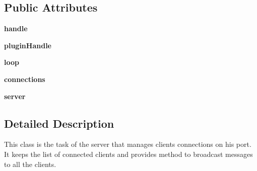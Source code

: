 \subsection*{\-Public \-Attributes}
\begin{DoxyCompactItemize}
\item 
\hypertarget{classshared_1_1network_1_1_network_server_a070aa96debd9445e630e667f612728fe}{{\bfseries handle}}\label{classshared_1_1network_1_1_network_server_a070aa96debd9445e630e667f612728fe}

\item 
\hypertarget{classshared_1_1network_1_1_network_server_aff63d97c930378baf920826eafdf278d}{{\bfseries plugin\-Handle}}\label{classshared_1_1network_1_1_network_server_aff63d97c930378baf920826eafdf278d}

\item 
\hypertarget{classshared_1_1network_1_1_network_server_a63d3cf54c15f4c6a3741133dd221c9cf}{{\bfseries loop}}\label{classshared_1_1network_1_1_network_server_a63d3cf54c15f4c6a3741133dd221c9cf}

\item 
\hypertarget{classshared_1_1network_1_1_network_server_a17f73968f757db6e3e44fdbe08a04fbd}{{\bfseries connections}}\label{classshared_1_1network_1_1_network_server_a17f73968f757db6e3e44fdbe08a04fbd}

\item 
\hypertarget{classshared_1_1network_1_1_network_server_afea8047766c8674b880a678f812be765}{{\bfseries server}}\label{classshared_1_1network_1_1_network_server_afea8047766c8674b880a678f812be765}

\end{DoxyCompactItemize}


\subsection{\-Detailed \-Description}
\begin{DoxyVerb}
This class is the task of the server that manages clients connections on
his port.  It keeps the list of connected clients and provides method to
broadcast messages to all the clients.
\end{DoxyVerb}
 

